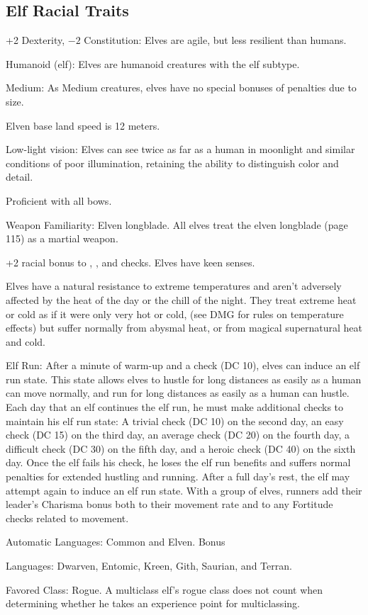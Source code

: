 \subsection{Elf Racial Traits}
\begin{itemize*}
    \item +2 Dexterity, $-2$ Constitution: Elves are agile, but less resilient than humans.
    \item Humanoid (elf): Elves are humanoid creatures with the elf subtype.
    \item Medium: As Medium creatures, elves have no special bonuses of penalties due to size.
    \item Elven base land speed is 12 meters.
    \item Low-light vision: Elves can see twice as far as a human in moonlight and similar conditions of poor illumination, retaining the ability to distinguish color and detail.
    \item Proficient with all bows.
    \item Weapon Familiarity: Elven longblade. All elves treat the elven longblade (page 115) as a martial weapon.
    \item +2 racial bonus to , ,  and  checks. Elves have keen senses.
    \item Elves have a natural resistance to extreme temperatures and aren't adversely affected by the heat of the day or the chill of the night. They treat extreme heat or cold as if it were only very hot or cold, (see DMG for rules on temperature effects) but suffer normally from abysmal heat, or from magical supernatural heat and cold.
    \item Elf Run: After a minute of warm-up and a  check (DC 10), elves can induce an elf run state. This state allows elves to hustle for long distances as easily as a human can move normally, and run for long distances as easily as a human can hustle. Each day that an elf continues the elf run, he must make additional  checks to maintain his elf run state: A trivial check (DC 10) on the second day, an easy check (DC 15) on the third day, an average check (DC 20) on the fourth day, a difficult check (DC 30) on the fifth day, and a heroic check (DC 40) on the sixth day. Once the elf fails his  check, he loses the elf run benefits and suffers normal penalties for extended hustling and running. After a full day's rest, the elf may attempt again to induce an elf run state. With a group of elves, runners add their leader's Charisma bonus both to their movement rate and to any Fortitude checks related to movement.
    \item Automatic Languages: Common and Elven. Bonus
    \item Languages: Dwarven, Entomic, Kreen, Gith, Saurian, and Terran.
    \item Favored Class: Rogue. A multiclass elf's rogue class does not count when determining whether he takes an experience point for multiclassing.
\end{itemize*}